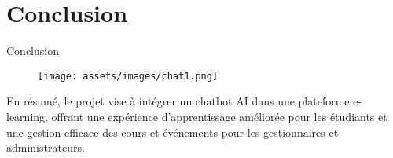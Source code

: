 \section{Conclusion}

\begin{frame}{Conclusion}
    \begin{figure}[htpb]
        \centering
        \texttt{[image: assets/images/chat1.png]}
    \end{figure}
    En résumé, le projet vise à intégrer un chatbot AI dans une plateforme e-learning, offrant une expérience d’apprentissage améliorée pour les étudiants et une gestion efficace des cours et événements pour les gestionnaires et administrateurs.
\end{frame}
